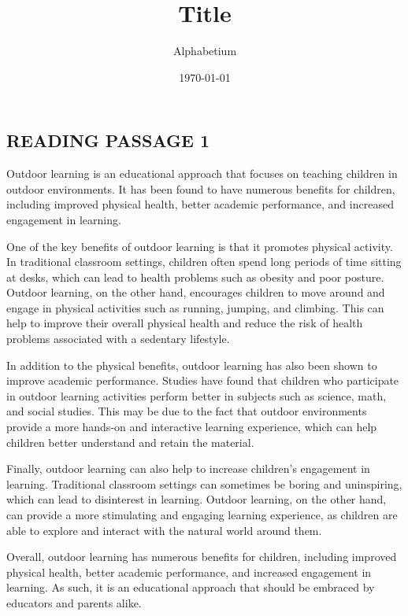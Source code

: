 \documentclass[10pt, a4paper, oneside]{article}
\title{Title}
\date{\today}
\author{Alphabetium}
\begin{document}
\begin{spacing}{2.0}
\maketitle


\section{READING PASSAGE 1}

Outdoor learning is an educational approach that focuses on teaching children in outdoor environments. It has been found to 
have numerous benefits for children, including improved physical health, better academic performance, and increased engagement in learning.

One of the key benefits of outdoor learning is that it promotes physical activity. In traditional classroom settings, 
children often spend long periods of time sitting at desks, which can lead to health problems such as obesity and poor posture. 
Outdoor learning, on the other hand, encourages children to move around and engage in physical activities such as running, jumping, 
and climbing. This can help to improve their overall physical health and reduce the risk of health problems associated with a 
sedentary lifestyle.

In addition to the physical benefits, outdoor learning has also been shown to improve academic performance. 
Studies have found that children who participate in outdoor learning activities perform better in subjects such as science, math, 
and social studies. This may be due to the fact that outdoor environments provide a more hands-on and interactive learning experience, 
which can help children better understand and retain the material.

Finally, outdoor learning can also help to increase children's engagement in learning. Traditional classroom settings can sometimes 
be boring and uninspiring, which can lead to disinterest in learning. Outdoor learning, on the other hand, can provide a more stimulating 
and engaging learning experience, as children are able to explore and interact with the natural world around them.

Overall, outdoor learning has numerous benefits for children, including improved physical health, better academic performance, 
and increased engagement in learning. As such, it is an educational approach that should be embraced by educators and parents alike.




\end{spacing}
\end{document}
